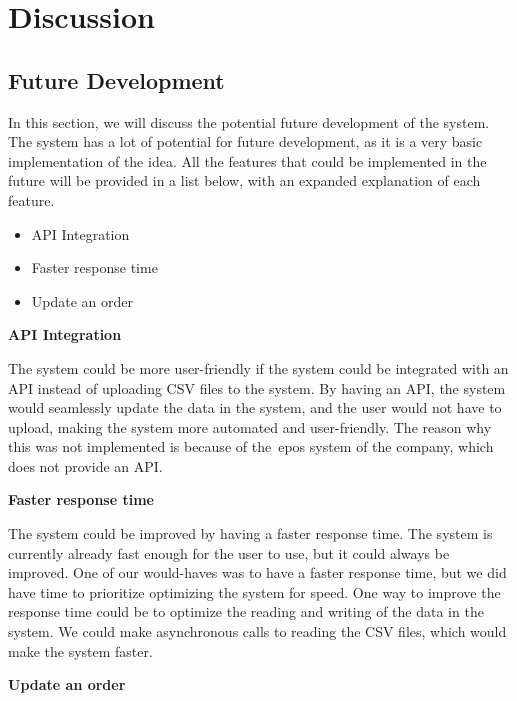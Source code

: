 \section{Discussion}\label{sec:discussion-conclusion}

\subsection{Future Development}\label{subsec:future-development}
In this section, we will discuss the potential future development of the system.
The system has a lot of potential for future development, as it is a very basic implementation of the idea.
All the features that could be implemented in the future will be provided in a list below, with an expanded
explanation of each feature.

\begin{itemize}
    \item API Integration
    \item Faster response time
    \item Update an order
\end{itemize}

\noindent
\newline
\textbf{API Integration}

\noindent
The system could be more user-friendly if the system could be integrated with an API instead of uploading CSV files
to the system.
By having an API, the system would seamlessly update the data in the system, and the user would not have to upload,
making the system more automated and user-friendly.
The reason why this was not implemented is because of the~\acrshort{epos} system of the company, which does not provide
an API\@.

\noindent
\textbf{Faster response time}

\noindent
The system could be improved by having a faster response time.
The system is currently already fast enough for the user to use, but it could always be improved.
One of our would-haves was to have a faster response time, but we did have time to prioritize optimizing the system
for speed.
One way to improve the response time could be to optimize the reading and writing of the data in the system.
We could make asynchronous calls to reading the CSV files, which would make the system faster.

\noindent
\newline
\textbf{Update an order}


